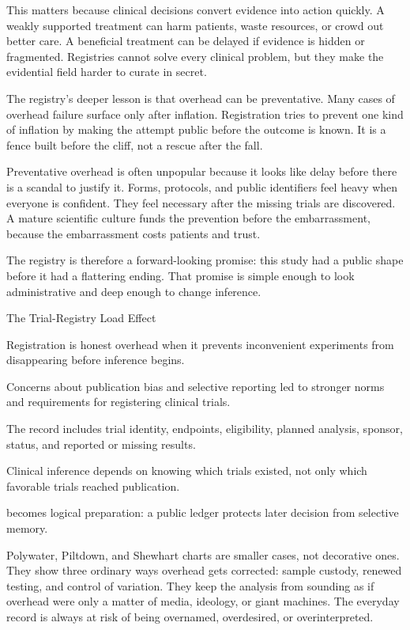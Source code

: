 This matters because clinical decisions convert evidence into action quickly.
A weakly supported treatment can harm patients, waste resources, or crowd out
better care. A beneficial treatment can be delayed if evidence is hidden or
fragmented. Registries cannot solve every clinical problem, but they make the
evidential field harder to curate in secret.

The registry's deeper lesson is that overhead can be preventative. Many cases
of overhead failure surface only after inflation. Registration tries to
prevent one kind of inflation by making the attempt public before the outcome
is known. It is a fence built before the cliff, not a rescue after the fall.

Preventative overhead is often unpopular because it looks like delay before
there is a scandal to justify it. Forms, protocols, and public identifiers
feel heavy when everyone is confident. They feel necessary after the missing
trials are discovered. A mature scientific culture funds the prevention before
the embarrassment, because the embarrassment costs patients and trust.

The registry is therefore a forward-looking promise: this study had a public
shape before it had a flattering ending. That promise is simple enough to look
administrative and deep enough to change inference.

\begin{phenom}{The Trial-Registry Load Effect~\cite{dickersin1992,icmje2004}}
\label{ph:trial-registry-load}

\PhStatement
Registration is honest overhead when it prevents inconvenient experiments from
disappearing before inference begins.

\PhOrigin
Concerns about publication bias and selective reporting led to stronger norms
and requirements for registering clinical trials.

\PhObservation
The record includes trial identity, endpoints, eligibility, planned analysis,
sponsor, status, and reported or missing results.

\PhConstraint
Clinical inference depends on knowing which trials existed, not only which
favorable trials reached publication.

\PhConsequence
{} becomes logical preparation: a public ledger protects later
decision from selective memory.
\end{phenom}

Polywater, Piltdown, and Shewhart charts are smaller cases, not decorative
ones. They show three ordinary ways overhead gets corrected: sample custody,
renewed testing, and control of variation. They keep the analysis from
sounding as if overhead were only a matter of media, ideology, or giant
machines. The everyday record is always at risk of being overnamed,
overdesired, or overinterpreted.

